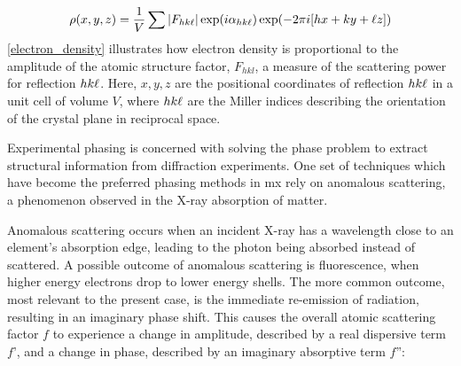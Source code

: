 


\begin{equation}
    \rho(x,y,z)=\frac{1}{V} \sum |F_{hk\ell}| \exp(i\alpha_{hk\ell}) \exp(-2\pi i [hx+ky+\ell z]) \label{electron_density}
\end{equation}
\cref{electron_density} illustrates how electron density is proportional to the amplitude of the atomic structure factor, $F_{hkl}$, a measure of the scattering power for reflection $hk\ell$. Here, $x,y,z$ are the positional coordinates of reflection $hk\ell$ in a unit cell of volume $V$, where $hk\ell$ are the Miller indices describing the orientation of the crystal plane in reciprocal space. %

Experimental phasing is concerned with solving the phase problem to extract structural information from diffraction experiments. One set of techniques which have become the preferred phasing methods in \ac{mx} rely on anomalous scattering, a phenomenon observed in the X-ray absorption of matter.

Anomalous scattering occurs when an incident X-ray has a wavelength close to an element’s absorption edge, leading to the photon being absorbed instead of scattered. A possible outcome of anomalous scattering is fluorescence, when higher energy electrons drop to lower energy shells. The more common outcome, most relevant to the present case, is the immediate re-emission of radiation, resulting in an imaginary phase shift. This causes the overall atomic scattering factor $f$ to experience a change in amplitude, described by a real dispersive term $f’$, and a change in phase, described by an imaginary absorptive term $f”$:

